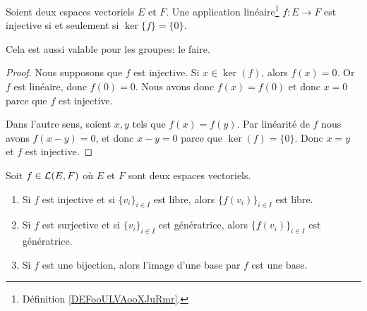 \begin{proposition}
    Soient deux espaces vectoriels \( E\) et \( F\). Une application linéaire\footnote{Définition \ref{DEFooULVAooXJuRmr}.} \( f\colon E\to F\) est injective si et seulement si \( \ker\{ f \}=\{ 0 \}\).
\end{proposition}

\begin{probleme}
Cela est aussi valable pour les groupes: le faire.
\end{probleme}

\begin{proof}
    Nous supposons que \( f\) est injective. Si \( x\in\ker(f)\), alors \( f(x)=0\). Or \( f\) est linéaire, donc \( f(0)=0\). Nous avons donc \( f(x)=f(0)\) et donc \( x=0\) parce que \( f\) est injective.

    Dans l'autre sens, soient \( x,y\) tels que \( f(x)=f(y)\). Par linéarité de \( f\) nous avons \( f(x-y)=0\), et donc \( x-y=0\) parce que \( \ker(f)=\{0\}\). Donc \( x=y\) et \( f\) est injective.
\end{proof}

\begin{proposition}      \label{PROPooZFKZooBGLSex}
    Soit \( f\in \mathcal{L}(E,F)\) où \( E\) et \( F\) sont deux espaces vectoriels.
    \begin{enumerate}
        \item   \label{ITEMooPPMEooIaZqtm}
            Si \( f\) est injective et si \( \{v_i\}_{i\in I}\) est libre, alors \( \{f(v_i)\}_{i\in I}\) est libre.
        \item   \label{ITEMooOZSPooQBrDGi}
            Si \( f\) est surjective et si \( \{v_i\}_{i\in I}\) est génératrice, alors \( \{f(v_i)\}_{i\in I}\) est génératrice.
        \item   \label{ITEMooOIEYooIfdFnv}
            Si \( f\) est une bijection, alors l'image d'une base par \( f\) est une base.
    \end{enumerate}
\end{proposition}

